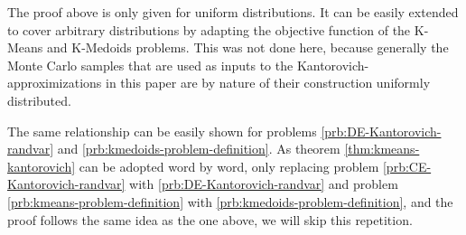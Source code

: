 \begin{Note}
  The proof above is only given for uniform distributions.
  It can be easily extended to cover arbitrary distributions by adapting the objective function of the K-Means and K-Medoids problems.
  This was not done here, because generally the Monte Carlo samples that are used as inputs to the Kantorovich-approximizations in this paper are by nature of their construction uniformly distributed.
\end{Note}
The same relationship can be easily shown for problems \ref{prb:DE-Kantorovich-randvar} and \ref{prb:kmedoids-problem-definition}.
As theorem \ref{thm:kmeans-kantorovich} can be adopted word by word, only replacing problem \ref{prb:CE-Kantorovich-randvar} with \ref{prb:DE-Kantorovich-randvar} and problem \ref{prb:kmeans-problem-definition} with \ref{prb:kmedoids-problem-definition}, and the proof follows the same idea as the one above, we will skip this repetition.
